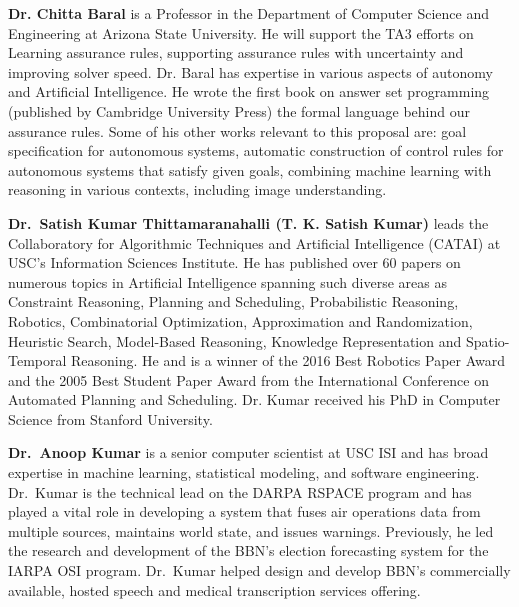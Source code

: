 \documentclass[12pt]{dod-blank}
\begin{document}
{\bf Dr. Chitta Baral} is a Professor in the Department of Computer Science and Engineering at Arizona State University. He will support the TA3 efforts on Learning assurance rules, supporting assurance rules with uncertainty and improving solver speed. Dr. Baral has expertise in various aspects of autonomy and Artificial Intelligence. 
He wrote the first book on answer set programming (published by Cambridge University Press) the formal language behind our assurance rules. Some of his other works relevant to this proposal are: goal specification for autonomous systems, automatic construction of control rules for autonomous systems that satisfy given goals, combining machine learning with reasoning in various contexts, including image understanding. %

{\bf Dr.\ Satish Kumar Thittamaranahalli (T. K. Satish Kumar)} leads the Collaboratory for Algorithmic Techniques and Artificial Intelligence (CATAI) at USC's Information Sciences Institute. He has published over 60 papers on numerous topics in Artificial Intelligence spanning such diverse areas as Constraint Reasoning, Planning and Scheduling, Probabilistic Reasoning, Robotics, Combinatorial Optimization, Approximation and Randomization, Heuristic Search, Model-Based Reasoning, Knowledge Representation and Spatio-Temporal Reasoning. %
He and is a winner of the 2016 Best Robotics Paper Award and the 2005 Best Student Paper Award from the International Conference on Automated Planning and Scheduling. 
Dr. Kumar received his PhD in Computer Science from Stanford University. %

\textbf{Dr.\ Anoop Kumar} is a senior computer scientist at USC ISI and has broad expertise in machine learning, statistical modeling, and software engineering.  Dr.\ Kumar is the technical lead on the DARPA RSPACE program and has played a vital role in developing a system that fuses air operations data from multiple sources, maintains world state, and issues warnings. Previously, he led the research and development of the BBN’s election forecasting system for the IARPA OSI program. %
Dr.\ Kumar helped design and develop BBN's commercially available, hosted speech and medical transcription services offering. 
\end{document}

